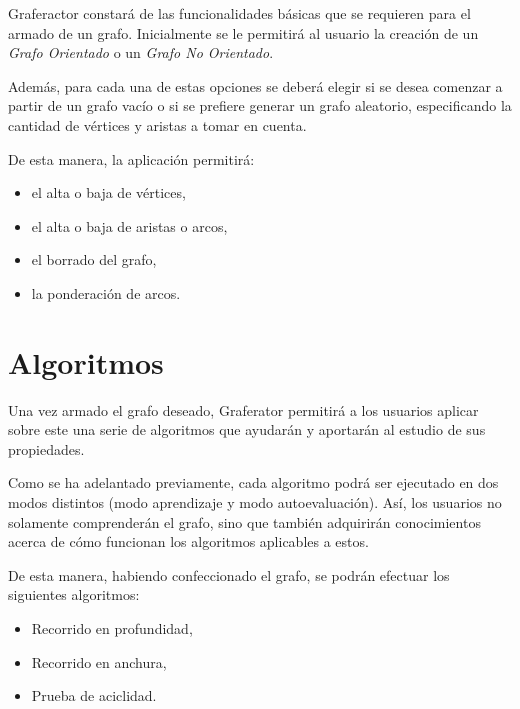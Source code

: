 \documentclass{book}
\begin{document}
	Graferactor constará de las funcionalidades básicas que se requieren para el armado de un grafo. Inicialmente se le permitirá al usuario la creación de un \textit{Grafo Orientado} o un \textit{Grafo No Orientado}. 
	\par
	Además, para cada una de estas opciones se deberá elegir si se desea comenzar a partir de un grafo vacío o si se prefiere generar un grafo aleatorio, especificando la cantidad de vértices y aristas a tomar en cuenta.
	\par
	De esta manera, la aplicación permitirá:
	\medskip

	\begin{itemize}
		\renewcommand{\labelitemi}{\scriptsize\tiny$\blacksquare$} 
		\itemsep=2pt \topsep=0pt \partopsep=0pt \parskip=0pt \parsep=0pt
		
		\item el alta o baja de vértices,

		\item el alta o baja de aristas o arcos,

		\item el borrado del grafo,

		\item la ponderación de arcos.

	\end{itemize}
	\medskip


\section{Algoritmos}

	Una vez armado el grafo deseado, Graferator permitirá a los usuarios aplicar sobre este una serie de algoritmos que ayudarán y aportarán al estudio de sus propiedades.
	\par
	Como se ha adelantado previamente, cada algoritmo podrá ser ejecutado en dos modos distintos (modo aprendizaje y modo autoevaluación). Así, los usuarios no solamente comprenderán el grafo, sino que también adquirirán conocimientos acerca de cómo funcionan los algoritmos aplicables a estos.
	\par
	De esta manera, habiendo confeccionado el grafo, se podrán efectuar los siguientes algoritmos:


	\begin{itemize}
		\renewcommand{\labelitemi}{\scriptsize\tiny$\blacksquare$} 
		\itemsep=2pt \topsep=0pt \partopsep=0pt \parskip=0pt \parsep=0pt
		
		\item Recorrido en profundidad,

		\item Recorrido en anchura,

		\item Prueba de aciclidad.

	\end{itemize}
	\medskip
\end{document}
